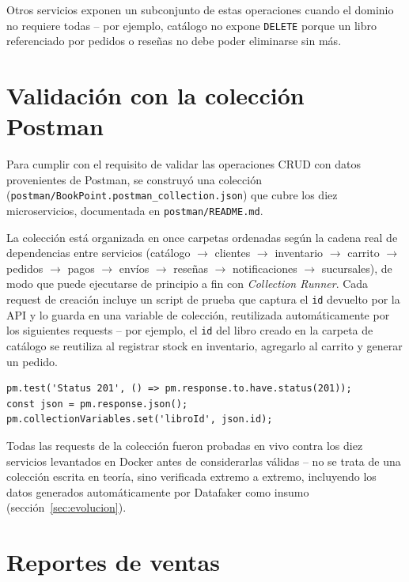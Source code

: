 Otros servicios exponen un subconjunto de estas operaciones cuando el dominio no
requiere todas -- por ejemplo, catálogo no expone \texttt{DELETE} porque un libro
referenciado por pedidos o reseñas no debe poder eliminarse sin más.

\section{Validación con la colección Postman}

Para cumplir con el requisito de validar las operaciones CRUD con datos provenientes de
Postman, se construyó una colección (\texttt{postman/BookPoint.postman\_collection.json})
que cubre los diez microservicios, documentada en \texttt{postman/README.md}.

La colección está organizada en once carpetas ordenadas según la cadena real de
dependencias entre servicios (catálogo $\rightarrow$ clientes $\rightarrow$ inventario
$\rightarrow$ carrito $\rightarrow$ pedidos $\rightarrow$ pagos $\rightarrow$ envíos
$\rightarrow$ reseñas $\rightarrow$ notificaciones $\rightarrow$ sucursales), de modo
que puede ejecutarse de principio a fin con \textit{Collection Runner}. Cada request de
creación incluye un script de prueba que captura el \texttt{id} devuelto por la API y
lo guarda en una variable de colección, reutilizada automáticamente por los siguientes
requests -- por ejemplo, el \texttt{id} del libro creado en la carpeta de catálogo se
reutiliza al registrar stock en inventario, agregarlo al carrito y generar un pedido.

\begin{lstlisting}[caption={Script de test de Postman -- captura automática de ID al crear un libro}]
pm.test('Status 201', () => pm.response.to.have.status(201));
const json = pm.response.json();
pm.collectionVariables.set('libroId', json.id);
\end{lstlisting}

Todas las requests de la colección fueron probadas en vivo contra los diez servicios
levantados en Docker antes de considerarlas válidas -- no se trata de una colección
escrita en teoría, sino verificada extremo a extremo, incluyendo los datos generados
automáticamente por Datafaker como insumo (sección~\ref{sec:evolucion}).

\section{Reportes de ventas}

